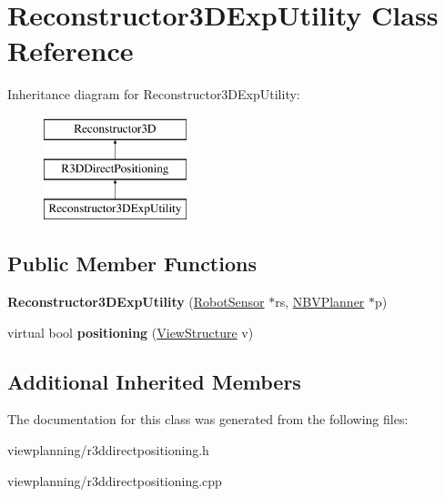 \hypertarget{classReconstructor3DExpUtility}{}\section{Reconstructor3\+D\+Exp\+Utility Class Reference}
\label{classReconstructor3DExpUtility}
Inheritance diagram for Reconstructor3\+D\+Exp\+Utility\+:\begin{figure}[H]
\begin{center}
\leavevmode
\includegraphics[height=3.000000cm]{classReconstructor3DExpUtility}
\end{center}
\end{figure}
\subsection*{Public Member Functions}
\begin{DoxyCompactItemize}
\item 
{\bfseries Reconstructor3\+D\+Exp\+Utility} (\hyperlink{classRobotSensor}{Robot\+Sensor} $\ast$rs, \hyperlink{classNBVPlanner}{N\+B\+V\+Planner} $\ast$p)\hypertarget{classReconstructor3DExpUtility_af0ba7028b3e96e3a8651f7bf3c585e6d}{}\label{classReconstructor3DExpUtility_af0ba7028b3e96e3a8651f7bf3c585e6d}

\item 
virtual bool {\bfseries positioning} (\hyperlink{classViewStructure}{View\+Structure} v)\hypertarget{classReconstructor3DExpUtility_a1c137e9902abc841e1e955c27a74cbd8}{}\label{classReconstructor3DExpUtility_a1c137e9902abc841e1e955c27a74cbd8}

\end{DoxyCompactItemize}
\subsection*{Additional Inherited Members}


The documentation for this class was generated from the following files\+:\begin{DoxyCompactItemize}
\item 
viewplanning/r3ddirectpositioning.\+h\item 
viewplanning/r3ddirectpositioning.\+cpp\end{DoxyCompactItemize}
